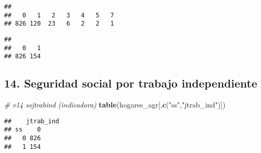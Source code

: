 \documentclass[11pt,]{article}
\newenvironment{Shaded}{\begin{snugshade}}{\end{snugshade}}
\newcommand{\KeywordTok}[1]{\textcolor[rgb]{0.13,0.29,0.53}{\textbf{#1}}}
\newcommand{\DecValTok}[1]{\textcolor[rgb]{0.00,0.00,0.81}{#1}}
\newcommand{\StringTok}[1]{\textcolor[rgb]{0.31,0.60,0.02}{#1}}
\newcommand{\CommentTok}[1]{\textcolor[rgb]{0.56,0.35,0.01}{\textit{#1}}}
\newcommand{\OperatorTok}[1]{\textcolor[rgb]{0.81,0.36,0.00}{\textbf{#1}}}
\newcommand{\NormalTok}[1]{#1}
\begin{document}
\begin{Shaded}
\end{Shaded}

\begin{verbatim}
## 
##   0   1   2   3   4   5   7 
## 826 120  23   6   2   2   1
\end{verbatim}

\begin{Shaded}
\end{Shaded}

\begin{verbatim}
## 
##   0   1 
## 826 154
\end{verbatim}

\subsection{14. Seguridad social por trabajo
independiente}\label{seguridad-social-por-trabajo-independiente}

\begin{Shaded}
\begin{Highlighting}[]
\CommentTok{# v14 ssjtrabind (indicadora)}
\KeywordTok{table}\NormalTok{(hogares_agr[,}\KeywordTok{c}\NormalTok{(}\StringTok{"ss"}\NormalTok{,}\StringTok{"jtrab_ind"}\NormalTok{)])}
\end{Highlighting}
\end{Shaded}

\begin{verbatim}
##    jtrab_ind
## ss    0
##   0 826
##   1 154
\end{verbatim}
\end{document}
